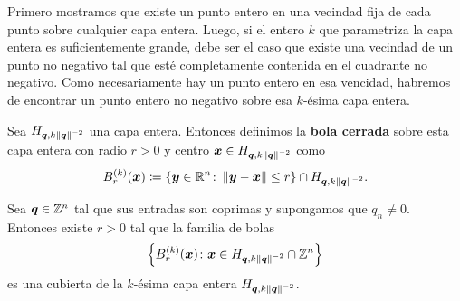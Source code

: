 Primero mostramos que existe un punto entero en una vecindad fija de cada punto sobre cualquier capa
entera. Luego, si el entero $k$ que parametriza la capa entera es suficientemente grande, debe ser
el caso que existe una vecindad de un punto no negativo tal que esté completamente contenida en el
cuadrante no negativo. Como necesariamente hay un punto entero en esa vencidad, habremos de
encontrar un punto entero no negativo sobre esa $k$-ésima capa entera.

\begin{definition}
	\label{fin:def:ball}
	Sea $H_{\boldsymbol{q}, k\left\lVert \boldsymbol{q} \right\rVert^{-2}}$ una capa entera. Entonces definimos la \textbf{bola
	cerrada} sobre
	esta capa entera con radio $r > 0$ y centro $\boldsymbol{x} \in H_{\boldsymbol{q}, k\left\lVert \boldsymbol{q} \right\rVert^{-2}}$ como
	\begin{equation}
		\label{eq:k-ball}
		B_r^{(k)}(\boldsymbol{x}) \coloneq \lbrace \boldsymbol{y} \in \mathbb{R}^n \colon \left\lVert \boldsymbol{y} - \boldsymbol{x} \right\rVert \leq r
		\rbrace \cap H_{\boldsymbol{q}, k \left\lVert \boldsymbol{q} \right\rVert^{-2}}.
	\end{equation}
\end{definition}
\begin{lemma}
	\label{lemma:ball-cover}
	Sea $\boldsymbol{q} \in \mathbb{Z}^n$ tal que sus entradas son coprimas y supongamos que $q_n \neq 0$. Entonces
	existe $r > 0$ tal que la familia de bolas
	\begin{equation*}
		\left\lbrace B_r^{(k)}(\boldsymbol{x}) \colon \boldsymbol{x} \in H_{\boldsymbol{q}, k\left\lVert \boldsymbol{q} \right\rVert^{-2}} \cap
			\mathbb{Z}^n \right\rbrace
	\end{equation*}
	es una cubierta de la $k$-ésima capa entera $H_{\boldsymbol{q}, k\left\lVert \boldsymbol{q} \right\rVert^{-2}}$.
\end{lemma}
